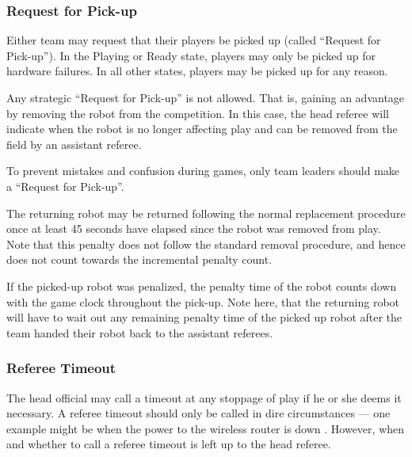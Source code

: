 

\subsubsection{Request for Pick-up}
\label{sec:request_for_pickup}

Either team may request that their players be picked up (called ``Request for Pick-up'').
In the Playing or Ready state, players may only be picked up for hardware failures.
In all other states, players may be picked up for any reason.



Any strategic ``Request for Pick-up'' is not allowed.
That is, gaining an advantage by removing the robot from the competition.
In this case, the head referee will indicate when the robot is no longer affecting play and can be removed from the field by an assistant referee.

To prevent mistakes and confusion during games, only team leaders should make a ``Request for Pick-up''.

The returning robot may be returned following the normal replacement procedure once at least 45 seconds have elapsed since the robot was removed from play. Note that this penalty does not follow the standard removal procedure, and hence does not count towards the incremental penalty count.

If the picked-up robot was penalized, the penalty time of the robot counts down with the game clock throughout the pick-up.
Note here, that the returning robot will have to wait out any remaining penalty time of the picked up robot after the team handed their robot back to the assistant referees.

\subsubsection{Referee Timeout}
\label{sec:referee_timeout}
The head official may call a timeout at any stoppage of play if he or she deems it necessary. A referee timeout should only be called in dire circumstances --- one example might be when the power to the wireless router is down . However, when and whether to call a referee timeout is left up to the head referee.

